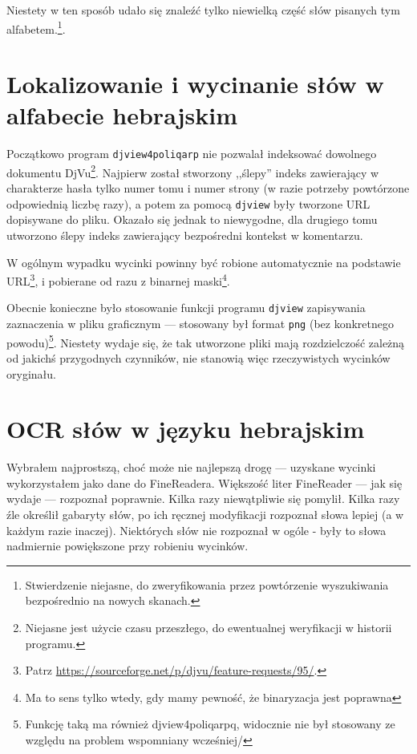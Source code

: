\documentclass[12]{mwart}
\begin{document}
Niestety w ten sposób udało się znaleźć tylko niewielką część słów
pisanych tym alfabetem.\footnote{Stwierdzenie niejasne, do
  zweryfikowania przez powtórzenie wyszukiwania bezpośrednio na nowych
  skanach.}.

\section{Lokalizowanie i wycinanie słów w alfabecie hebrajskim}
\label{sec:lokal-i-wycin}

Początkowo program \texttt{djview4poliqarp} nie pozwalał indeksować
dowolnego dokumentu DjVu\footnote{Niejasne jest użycie czasu
  przeszłego, do ewentualnej weryfikacji w historii
  programu.}. Najpierw został stworzony ,,ślepy'' indeks zawierający w
charakterze hasła tylko numer tomu i numer strony (w razie potrzeby
powtórzone odpowiednią liczbę razy), a potem za pomocą \texttt{djview}
były tworzone URL dopisywane do pliku. Okazało się jednak to
niewygodne, dla drugiego tomu utworzono ślepy indeks zawierający
bezpośredni kontekst w komentarzu.

W ogólnym wypadku wycinki powinny być robione automatycznie na
podstawie URL\footnote{Patrz
  \url{https://sourceforge.net/p/djvu/feature-requests/95/}.}, i
pobierane od razu z binarnej maski\footnote{Ma to sens tylko wtedy,
  gdy mamy pewność, że binaryzacja jest poprawna}.

Obecnie konieczne było stosowanie funkcji programu \texttt{djview}
zapisywania zaznaczenia w pliku graficznym --- stosowany był format
\texttt{png} (bez konkretnego powodu)\footnote{Funkcję taką ma również
  \textsf{djview4poliqarpq}, widocznie nie był stosowany ze względu na
  problem wspomniany wcześniej/}. Niestety wydaje się, że tak
utworzone pliki mają rozdzielczość zależną od jakichś przygodnych
czynników, nie stanowią więc rzeczywistych wycinków oryginału.

\section{OCR słów w języku hebrajskim}
\label{sec:ocr-sow-w}

Wybrałem najprostszą, choć może nie najlepszą drogę --- uzyskane
wycinki wykorzystałem jako dane do FineReadera. Większość liter
FineReader --- jak się wydaje --- rozpoznał poprawnie. Kilka razy
niewątpliwie się pomylił. Kilka razy źle określił gabaryty słów, po
ich ręcznej modyfikacji rozpoznał słowa lepiej (a w każdym razie
inaczej). Niektórych słów nie rozpoznał w ogóle - były to słowa
nadmiernie powiększone przy robieniu wycinków.
\end{document}
